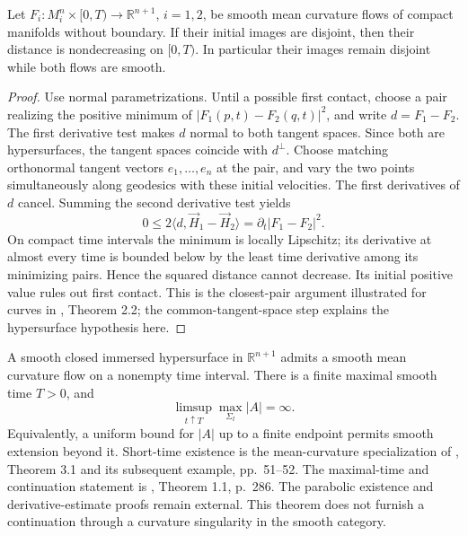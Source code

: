 \begin{proposition}\label{prop:mcf-avoidance}
Let $F_i:M_i^n\times[0,T)\to\mathbb R^{n+1}$, $i=1,2$, be smooth mean curvature flows of compact manifolds without boundary. If their initial images are disjoint, then their distance is nondecreasing on $[0,T)$. In particular their images remain disjoint while both flows are smooth.
\end{proposition}
\begin{proof}
Use normal parametrizations. Until a possible first contact, choose a pair realizing the positive minimum of $|F_1(p,t)-F_2(q,t)|^2$, and write $d=F_1-F_2$. The first derivative test makes $d$ normal to both tangent spaces. Since both are hypersurfaces, the tangent spaces coincide with $d^\perp$. Choose matching orthonormal tangent vectors $e_1,\ldots,e_n$ at the pair, and vary the two points simultaneously along geodesics with these initial velocities. The first derivatives of $d$ cancel. Summing the second derivative test yields
\[
 0\leq2\langle d,\vec H_1-\vec H_2\rangle
 =\partial_t|F_1-F_2|^2.
\]
On compact time intervals the minimum is locally Lipschitz; its derivative at almost every time is bounded below by the least time derivative among its minimizing pairs. Hence the squared distance cannot decrease. Its initial positive value rules out first contact. This is the closest-pair argument illustrated for curves in \cite{WhiMCF15}, Theorem 2.2; the common-tangent-space step explains the hypersurface hypothesis here.
\end{proof}

\begin{theorem}\label{thm:mcf-existence-continuation}
A smooth closed immersed hypersurface in $\mathbb R^{n+1}$ admits a smooth mean curvature flow on a nonempty time interval. There is a finite maximal smooth time $T>0$, and
\[
 \limsup_{t\uparrow T}\max_{\Sigma_t}|A|=\infty.
\]
Equivalently, a uniform bound for $|A|$ up to a finite endpoint permits smooth extension beyond it. Short-time existence is the mean-curvature specialization of \cite{HP99}, Theorem 3.1 and its subsequent example, pp.~51--52. The maximal-time and continuation statement is \cite{Hui90}, Theorem 1.1, p.~286. The parabolic existence and derivative-estimate proofs remain external. This theorem does not furnish a continuation through a curvature singularity in the smooth category.
\end{theorem}

